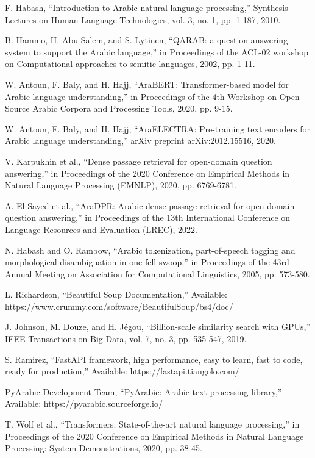 \documentclass[conference]{IEEEtran}
\begin{document}
\begin{thebibliography}{00}
 F. Habash, ``Introduction to Arabic natural language processing,'' Synthesis Lectures on Human Language Technologies, vol. 3, no. 1, pp. 1-187, 2010.

 B. Hammo, H. Abu-Salem, and S. Lytinen, ``QARAB: a question answering system to support the Arabic language,'' in Proceedings of the ACL-02 workshop on Computational approaches to semitic languages, 2002, pp. 1-11.

 W. Antoun, F. Baly, and H. Hajj, ``AraBERT: Transformer-based model for Arabic language understanding,'' in Proceedings of the 4th Workshop on Open-Source Arabic Corpora and Processing Tools, 2020, pp. 9-15.

 W. Antoun, F. Baly, and H. Hajj, ``AraELECTRA: Pre-training text encoders for Arabic language understanding,'' arXiv preprint arXiv:2012.15516, 2020.

 V. Karpukhin et al., ``Dense passage retrieval for open-domain question answering,'' in Proceedings of the 2020 Conference on Empirical Methods in Natural Language Processing (EMNLP), 2020, pp. 6769-6781.

 A. El-Sayed et al., ``AraDPR: Arabic dense passage retrieval for open-domain question answering,'' in Proceedings of the 13th International Conference on Language Resources and Evaluation (LREC), 2022.

 N. Habash and O. Rambow, ``Arabic tokenization, part-of-speech tagging and morphological disambiguation in one fell swoop,'' in Proceedings of the 43rd Annual Meeting on Association for Computational Linguistics, 2005, pp. 573-580.

 L. Richardson, ``Beautiful Soup Documentation,'' Available: https://www.crummy.com/software/BeautifulSoup/bs4/doc/

 J. Johnson, M. Douze, and H. Jégou, ``Billion-scale similarity search with GPUs,'' IEEE Transactions on Big Data, vol. 7, no. 3, pp. 535-547, 2019.

 S. Ramirez, ``FastAPI framework, high performance, easy to learn, fast to code, ready for production,'' Available: https://fastapi.tiangolo.com/

 PyArabic Development Team, ``PyArabic: Arabic text processing library,'' Available: https://pyarabic.sourceforge.io/

 T. Wolf et al., ``Transformers: State-of-the-art natural language processing,'' in Proceedings of the 2020 Conference on Empirical Methods in Natural Language Processing: System Demonstrations, 2020, pp. 38-45.

\end{thebibliography}
\end{document}
